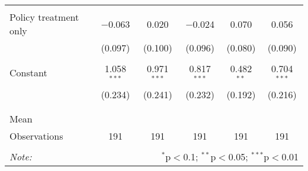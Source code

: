 \begin{tabular}{@{\extracolsep{5pt}}lccccc}
  & & & & & \\ 
 Policy treatment only & $-$0.063 & 0.020 & $-$0.024 & 0.070 & 0.056 \\ 
  & (0.097) & (0.100) & (0.096) & (0.080) & (0.090) \\ 
  & & & & & \\ 
 Constant & 1.058$^{***}$ & 0.971$^{***}$ & 0.817$^{***}$ & 0.482$^{**}$ & 0.704$^{***}$ \\ 
  & (0.234) & (0.241) & (0.232) & (0.192) & (0.216) \\ 
  & & & & & \\ 
\hline \\[-1.8ex] 
Mean &  &  &  &  &  \\ 
Observations & 191 & 191 & 191 & 191 & 191 \\ 
\hline 
\hline \\[-1.8ex] 
\textit{Note:}  & \multicolumn{5}{r}{$^{*}$p$<$0.1; $^{**}$p$<$0.05; $^{***}$p$<$0.01} \\ 
\end{tabular} 
